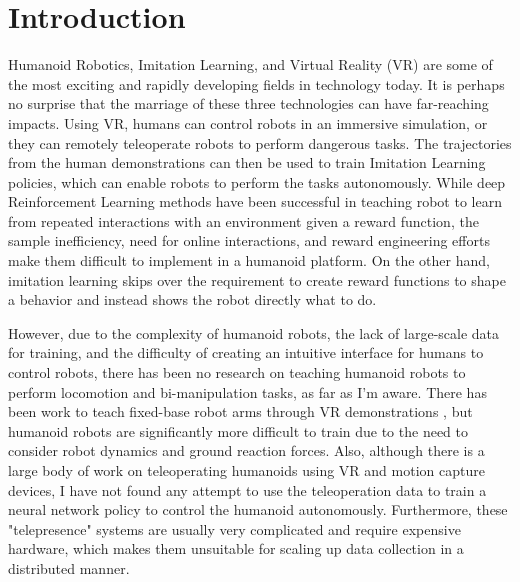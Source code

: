 \chapter{Introduction}


Humanoid Robotics, Imitation Learning, and Virtual Reality (VR) are some of the most exciting and rapidly developing fields in technology today. It is perhaps no surprise that the marriage of these three technologies can have far-reaching impacts. Using VR, humans can control robots in an immersive simulation, or they can remotely teleoperate robots to perform dangerous tasks. The trajectories from the human demonstrations can then be used to train Imitation Learning policies, which can enable robots to perform the tasks autonomously. While deep Reinforcement Learning methods have been successful in teaching robot to learn from repeated interactions with an environment given a reward function, the sample inefficiency, need for online interactions, and reward engineering efforts make them difficult to implement in a humanoid platform. On the other hand, imitation learning skips over the requirement to create reward functions to shape a behavior and instead shows the robot directly what to do. 

However, due to the complexity of humanoid robots, the lack of large-scale data for training, and the difficulty of creating an intuitive interface for humans to control robots, there has been no research on teaching humanoid robots to perform locomotion and bi-manipulation tasks, as far as I'm aware. There has been work to teach fixed-base robot arms through VR demonstrations \cite{zhang2018deep}, but humanoid robots are significantly more difficult to train due to the need to consider robot dynamics and ground reaction forces. Also, although there is a large body of work on teleoperating humanoids using VR and motion capture devices, I have not found any attempt to use the teleoperation data to train a neural network policy to control the humanoid autonomously. Furthermore, these "telepresence" systems are usually very complicated and require expensive hardware, which makes them unsuitable for scaling up data collection in a distributed manner.

